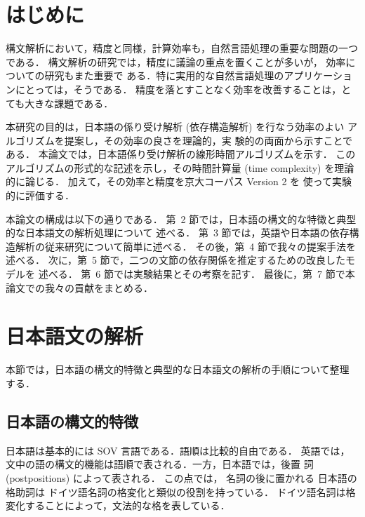 \documentclass[japanese]{jnlp_1.2c}
\begin{document}
\maketitle




\newcommand{\TermHead}{}



\section{はじめに}
構文解析において，精度と同様，計算効率も，自然言語処理の重要な問題の一つ
である．
構文解析の研究では，精度に議論の重点を置くことが多いが，
効率についての研究もまた重要で
ある．特に実用的な自然言語処理のアプリケーションにとっては，そうである．
精度を落とすことなく効率を改善することは，とても大きな課題である．


本研究の目的は，日本語の係り受け解析 (依存構造解析) を行なう効率のよい
アルゴリズムを提案し，その効率の良さを理論的，実
験的の両面から示すことである．
本論文では，日本語係り受け解析の線形時間アルゴリズムを示す．
このアルゴリズムの形式的な記述を示し，その時間計算量 
(time complexity) を理論的に論じる．
加えて，その効率と精度を京大コーパス Version 2 \cite{Kurohashi1998} を
使って実験的に評価する．


本論文の構成は以下の通りである．
第~2 節では，日本語の構文的な特徴と典型的な日本語文の解析処理について
述べる．
第~3 節では，英語や日本語の依存構造解析の従来研究について簡単に述べる．
その後，第~4 節で我々の提案手法を述べる．
次に，第~5 節で，二つの文節の依存関係を推定するための改良したモデルを
述べる．
第~6 節では実験結果とその考察を記す．
最後に，第~7 節で本論文での我々の貢献をまとめる．

\section{日本語文の解析}
本節では，日本語の構文的特徴と典型的な日本語文の解析の手順について整理
する．
\subsection{日本語の構文的特徴}\label{sec:prop}
日本語は基本的には SOV 言語である．語順は比較的自由である．
英語では，文中の語の構文的機能は語順で表される．一方，日本語では，後置
詞 (postpositions) によって表される．
この点では，
名詞の後に置かれる
日本語の格助詞は
ドイツ語名詞の格変化と類似の役割を持っている．
ドイツ語名詞は格変化することによって，文法的な格を表している．
\end{document}
